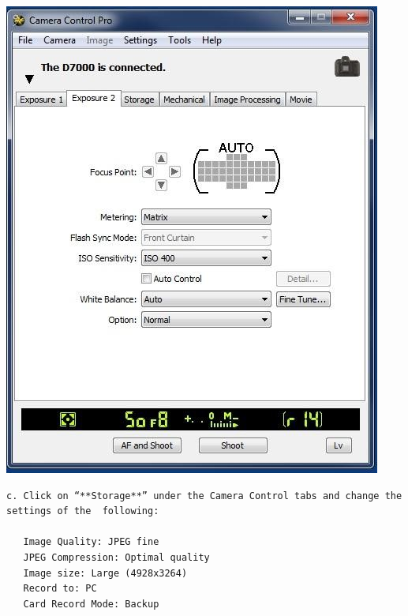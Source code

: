 \documentclass[
]{book}
\begin{document}
\includegraphics{images/Camera4.jpg}

\begin{verbatim}
c. Click on “**Storage**” under the Camera Control tabs and change the settings of the  following:  

   Image Quality: JPEG fine  
   JPEG Compression: Optimal quality  
   Image size: Large (4928x3264)  
   Record to: PC  
   Card Record Mode: Backup
\end{verbatim}
\end{document}
